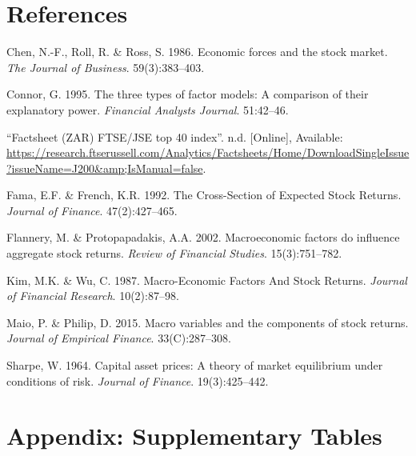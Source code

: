 \documentclass[11pt,preprint, authoryear]{elsarticle}
\numberwithin{equation}{section}
\numberwithin{figure}{section}
\numberwithin{table}{section}
\newlength{\cslhangindent}
\newenvironment{CSLReferences}%
  {\setlength{\parindent}{0pt}%
  \everypar{\setlength{\hangindent}{\cslhangindent}}\ignorespaces}%
  {\par}
\begin{document}
\hypertarget{references}{%
\section{References}\label{references}}

\hypertarget{refs}{}
\begin{CSLReferences}{1}{0}
\leavevmode\hypertarget{ref-Chen1986}{}%
Chen, N.-F., Roll, R. \& Ross, S. 1986. Economic forces and the stock
market. \emph{The Journal of Business}. 59(3):383--403.

\leavevmode\hypertarget{ref-Connor}{}%
Connor, G. 1995. The three types of factor models: A comparison of their
explanatory power. \emph{Financial Analysts Journal}. 51:42--46.

\leavevmode\hypertarget{ref-FTSE}{}%
{``Factsheet (ZAR) FTSE/JSE top 40 index''}. n.d. {[}Online{]},
Available:
\url{https://research.ftserussell.com/Analytics/Factsheets/Home/DownloadSingleIssue?issueName=J200\&amp;IsManual=false}.

\leavevmode\hypertarget{ref-Fama1992}{}%
Fama, E.F. \& French, K.R. 1992. {The Cross-Section of Expected Stock
Returns}. \emph{Journal of Finance}. 47(2):427--465.

\leavevmode\hypertarget{ref-Flannery}{}%
Flannery, M. \& Protopapadakis, A.A. 2002. Macroeconomic factors do
influence aggregate stock returns. \emph{Review of Financial Studies}.
15(3):751--782.

\leavevmode\hypertarget{ref-Kim1987}{}%
Kim, M.K. \& Wu, C. 1987. {Macro-Economic Factors And Stock Returns}.
\emph{Journal of Financial Research}. 10(2):87--98.

\leavevmode\hypertarget{ref-Maio2015}{}%
Maio, P. \& Philip, D. 2015. Macro variables and the components of stock
returns. \emph{Journal of Empirical Finance}. 33(C):287--308.

\leavevmode\hypertarget{ref-Sharpe1964}{}%
Sharpe, W. 1964. Capital asset prices: A theory of market equilibrium
under conditions of risk. \emph{Journal of Finance}. 19(3):425--442.

\end{CSLReferences}

\newpage

\hypertarget{appendix-supplementary-tables}{%
\section{Appendix: Supplementary
Tables}\label{appendix-supplementary-tables}}
\end{document}
